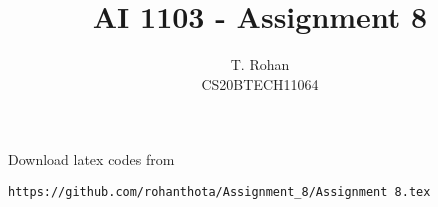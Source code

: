 \documentclass[journal,12pt,twocolumn]{IEEEtran}
\DeclareMathOperator*{\Res}{Res}
\begin{document}
\newcommand\givenbase[1][]{\:#1\lvert\:}
\newcommand{\BEQA}{\begin{eqnarray}}
\newcommand{\EEQA}{\end{eqnarray}}
\newcommand{\define}{\stackrel{\triangle}{=}}

\raggedbottom
\setlength{\parindent}{0pt}
\providecommand{\mbf}{\mathbf}
\providecommand{\pr}[1]{\ensuremath{\Pr\left(#1\right)}}
\providecommand{\qfunc}[1]{\ensuremath{Q\left(#1\right)}}
\providecommand{\sbrak}[1]{\ensuremath{{}\left[#1\right]}}
\providecommand{\lsbrak}[1]{\ensuremath{{}\left[#1\right.}}
\providecommand{\rsbrak}[1]{\ensuremath{{}\left.#1\right]}}
\providecommand{\brak}[1]{\ensuremath{\left(#1\right)}}
\providecommand{\lbrak}[1]{\ensuremath{\left(#1\right.}}
\providecommand{\rbrak}[1]{\ensuremath{\left.#1\right)}}
\providecommand{\cbrak}[1]{\ensuremath{\left\{#1\right\}}}
\providecommand{\lcbrak}[1]{\ensuremath{\left\{#1\right.}}
\providecommand{\rcbrak}[1]{\ensuremath{\left.#1\right\}}}
\theoremstyle{remark}
\newtheorem{rem}{Remark}
\newcommand{\sgn}{\mathop{\mathrm{sgn}}}
\providecommand{\abs}[1]{\vert#1\vert}
\providecommand{\res}[1]{\Res\displaylimits_{#1}} 
\providecommand{\norm}[1]{\lVert#1\rVert}
\providecommand{\mtx}[1]{\mathbf{#1}}
\providecommand{\mean}[1]{E[ #1 ]}
\providecommand{\fourier}{\overset{\mathcal{F}}{ \rightleftharpoons}}
\providecommand{\system}{\overset{\mathcal{H}}{ \longleftrightarrow}}
\newcommand{\solution}{\noindent \textbf{Solution: }}
\newcommand{\cosec}{\,\text{cosec}\,}
\providecommand{\dec}[2]{\ensuremath{\overset{#1}{\underset{#2}{\gtrless}}}}
\newcommand{\myvec}[1]{\ensuremath{\begin{pmatrix}#1\end{pmatrix}}}
\newcommand{\mydet}[1]{\ensuremath{\begin{vmatrix}#1\end{vmatrix}}}
\makeatletter
{}
\makeatother
\let\StandardTheFigure\thefigure
\let\vec\mathbf
\renewcommand{\thefigure}{\theproblem}
\def\putbox#1#2#3{\makebox[0in][l]{\makebox[#1][l]{}\raisebox{\baselineskip}[0in][0in]{\raisebox{#2}[0in][0in]{#3}}}}
     \def\rightbox#1{\makebox[0in][r]{#1}}
     \def\centbox#1{\makebox[0in]{#1}}
     \def\topbox#1{\raisebox{-\baselineskip}[0in][0in]{#1}}
     \def\midbox#1{\raisebox{-0.5\baselineskip}[0in][0in]{#1}}
\vspace{3cm}
\title{AI 1103 - Assignment 8}
\author{T. Rohan \\ CS20BTECH11064}
\maketitle
\newpage
\bigskip
\renewcommand{\thefigure}{\theenumi}
\renewcommand{\thetable}{\theenumi}
Download latex codes from 
\begin{lstlisting}
https://github.com/rohanthota/Assignment_8/Assignment 8.tex
\end{lstlisting}
\end{document}
